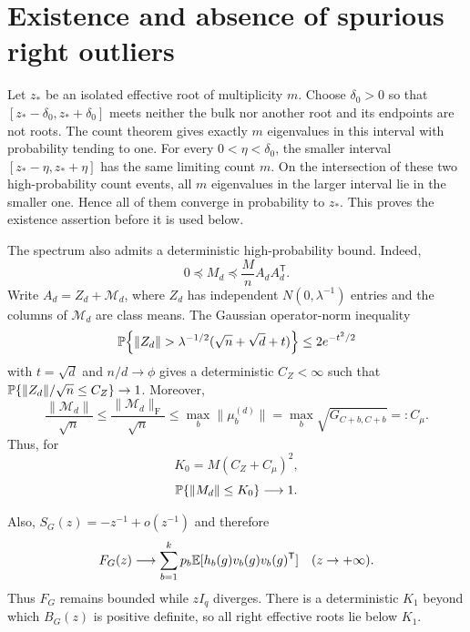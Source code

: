 \section{Existence and absence of spurious right outliers}

Let $z_*$ be an isolated effective root of multiplicity $m$. Choose
$\delta_0>0$ so that
$[z_*-\delta_0,z_*+\delta_0]$ meets neither the bulk nor another root and
its endpoints are not roots. The count theorem gives exactly $m$
eigenvalues in this interval with probability tending to one. For every
$0<\eta<\delta_0$, the smaller interval
$[z_*-\eta,z_*+\eta]$ has the same limiting count $m$. On the intersection
of these two high-probability count events, all $m$ eigenvalues in the
larger interval lie in the smaller one. Hence all of them converge in
probability to $z_*$. This proves the existence assertion before it is used
below.

The spectrum also admits a deterministic high-probability bound. Indeed,
\begin{equation}
0\preceq M_d\preceq\frac{M}{n}A_dA_d^{\mathsf T}.
\end{equation}
Write $A_d=Z_d+\mathcal M_d$, where $Z_d$ has independent
$N(0,\lambda^{-1})$ entries and the columns of $\mathcal M_d$ are class
means. The Gaussian operator-norm inequality \cite{DavidsonSzarek2001}
\begin{equation}
\Pp\!\left\{
\|Z_d\|>
\lambda^{-1/2}(\sqrt n+\sqrt d+t)
\right\}
\le 2e^{-t^2/2}
\end{equation}
with $t=\sqrt d$ and $n/d\to\phi$ gives a deterministic $C_Z<\infty$ such
that $\mathbb{P}\{\|Z_d\|/\sqrt n\le C_Z\}\to1$. Moreover,
\begin{equation}
\frac{\|\mathcal M_d\|}{\sqrt n}
\le
\frac{\|\mathcal M_d\|_{\mathrm F}}{\sqrt n}
\le\max_b\|\mu_b^{(d)}\|
=
\max_b\sqrt{G_{C+b,C+b}}=:C_\mu.
\end{equation}
Thus, for
\begin{equation}
K_0=M(C_Z+C_\mu)^2,
\end{equation}
\begin{equation}
\mathbb{P}\{\|M_d\|\le K_0\}\longrightarrow1.
\label{S:norm-tight}
\end{equation}

Also, $S_G(z)=-z^{-1}+o(z^{-1})$ and therefore
\begin{equation}
F_G(z)\longrightarrow
\sum_{b=1}^kp_b\mathbb{E}[h_b(g)v_b(g)v_b(g)^{\mathsf T}]
\quad(z\to+\infty).
\end{equation}
Thus $F_G$ remains bounded while $zI_q$ diverges. There is a deterministic
$K_1$ beyond which $B_G(z)$ is positive definite, so all right effective
roots lie below $K_1$.

